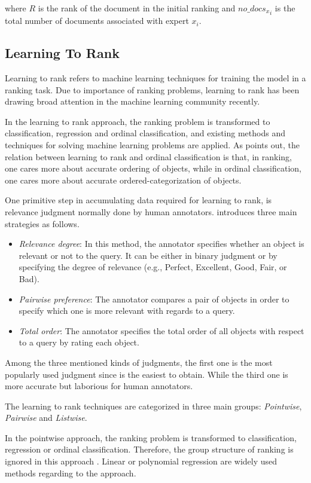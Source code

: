 \noindent 
where $R$ is the rank of the document in the initial ranking and ${no\_docs_x}_i$ is the total number of documents associated with expert $x_i$.

\subsection{Learning To Rank}
Learning to rank refers to machine learning techniques for training the model in a ranking task. Due to importance of ranking problems, learning to rank has been drawing broad attention in the machine learning community recently. 

In the learning to rank approach, the ranking problem is transformed to classification, regression and ordinal classification, and existing methods and techniques for solving machine learning problems are applied. As \citet{l2r-intro} points out, the relation between learning to rank and ordinal classification is that, in ranking, one cares more about accurate ordering of objects, while in ordinal classification, one cares more about accurate ordered-categorization of objects.

One primitive step in accumulating data required for learning to rank, is relevance judgment normally done by human annotators. \citet{l2r-book} introduces three main strategies as follows.
\begin{itemize}
\item \textit{Relevance degree}: In this method, the annotator specifies whether an object is relevant or not to the query. It can be either in binary judgment or by specifying the degree of relevance (e.g., Perfect, Excellent, Good, Fair, or Bad).
\item \textit{Pairwise preference}: The annotator compares a pair of objects in order to specify which one is more relevant with regards to a query.
\item \textit{Total order}: The annotator specifies the total order of all objects with respect to a query by rating each object.
\end{itemize}

Among the three mentioned kinds of judgments, the first one is the most popularly used judgment since is the easiest to obtain. While the third one is more accurate but laborious for human annotators.

The learning to rank techniques are categorized in three main groups: \textit{Pointwise}, \textit{Pairwise} and \textit{Listwise}.

In the pointwise approach, the ranking problem is transformed to classification, regression or ordinal classification. Therefore, the group structure of ranking is ignored in this approach \citep{l2r-intro}. Linear or polynomial regression are widely used methods regarding to the approach.

